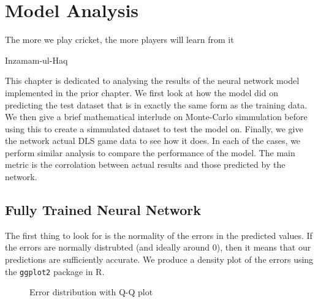 \chapter{Model Analysis}

\epigraph{The more we play cricket, the more players will learn from it}{Inzamam-ul-Haq}

This chapter is dedicated to analysing the results of the neural network model implemented in the prior chapter. We first look at how the model did on predicting the test dataset 
that is in exactly the same form as the training data. We then give a brief mathematical interlude on Monte-Carlo simmulation before using this to create a simmulated dataset 
to test the model on. Finally, we give the network actual DLS game data to see how it does. In each of the cases, we perform similar analysis to compare the performance of the model.
The main metric is the corrolation between actual results and those predicted by the network.

\section{Fully Trained Neural Network}
The first thing to look for is the normality of the errors in the predicted values. If the errors are normally distrubted (and ideally around 0),
then it means that our predictions are sufficiently accurate. We produce a density plot of the errors using the \verb|ggplot2| package in R.

\begin{figure}[h]
    \centering
    \qquad
    \caption{Error distribution with Q-Q plot}
    \label{errDistAndQQ}
\end{figure}

